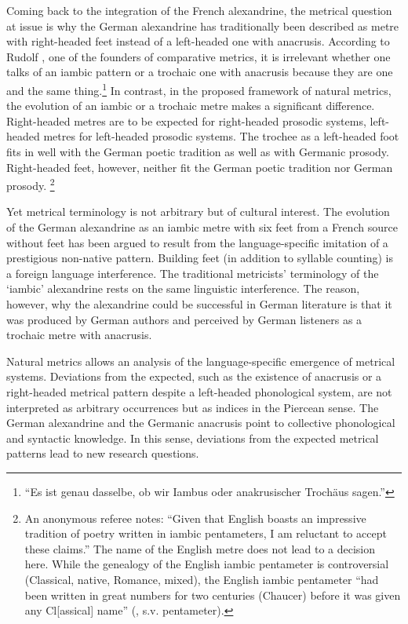 \documentclass[output=paper
  ,nobabel
  ,uniformtopskip %
]{langscibook}
\begin{document}
Coming back to the integration of the French alexandrine, the metrical question at issue is why the German alexandrine has traditionally been described as metre with right-headed feet instead of a left-headed one with anacrusis. According to Rudolf \citet[154]{Westphal1892}, one of the founders of comparative metrics, it is irrelevant whether one talks of an iambic pattern or a trochaic one with anacrusis because they are one and the same thing.\footnote{
``Es ist genau dasselbe, ob wir Iambus oder anakrusischer Trochäus sagen.''} In contrast, in the proposed framework of natural metrics, the evolution of an iambic or a trochaic metre makes a significant difference. Right-headed metres are to be expected for right-headed prosodic systems, left-headed metres for left-headed prosodic systems. The trochee as a left-headed foot fits in well with the German poetic tradition as well as with Germanic prosody. Right-headed feet, however, neither fit the German poetic tradition nor German prosody.%
%
\footnote{An anonymous referee notes: ``Given that English boasts an impressive tradition of poetry written in iambic pentameters, I am reluctant to accept these claims.'' The name of the English metre does not lead to a decision here. While the genealogy of the English iambic pentameter is controversial (Classical, native, Romance, mixed), the English iambic pentameter ``had been written in great numbers for two centuries (Chaucer) before it was given any Cl[assical] name'' (\citealt{Encyclopedia1993}, s.v. pentameter).} 

Yet metrical terminology is not arbitrary but of cultural interest. The evolution of the German alexandrine as an iambic metre with six feet from a French source without feet has been argued to result from the language-specific imitation of a prestigious non-native pattern. Building feet (in addition to syllable counting) is a foreign language interference. The traditional metricists' terminology of the `iambic' alexandrine rests on the same linguistic interference. The reason, however, why the alexandrine could be successful in German literature is that it was produced by German authors and perceived by German listeners as a trochaic metre with anacrusis.

Natural metrics allows an analysis of the language-specific emergence of metrical systems. Deviations from the expected, such as the existence of anacrusis or a right-headed metrical pattern despite a left-headed phonological system, are not interpreted as arbitrary occurrences but as indices in the Piercean sense. The German alexandrine and the Germanic anacrusis point to collective phonological and syntactic knowledge. In this sense, deviations from the expected metrical patterns lead to new research questions.
\end{document}
